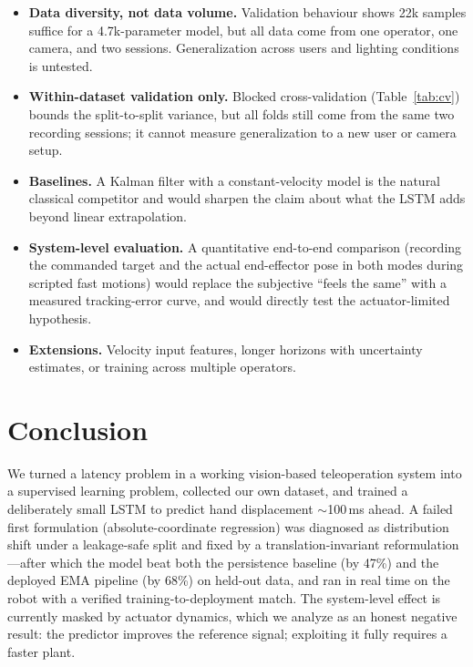 \documentclass[11pt,a4paper]{article}
\begin{document}
\begin{itemize}
  \item \textbf{Data diversity, not data volume.} Validation behaviour shows
        22k samples suffice for a 4.7k-parameter model, but all data come from
        one operator, one camera, and two sessions. Generalization across
        users and lighting conditions is untested.
  \item \textbf{Within-dataset validation only.} Blocked cross-validation
        (Table~\ref{tab:cv}) bounds the split-to-split variance, but all folds
        still come from the same two recording sessions; it cannot measure
        generalization to a new user or camera setup.
  \item \textbf{Baselines.} A Kalman filter with a constant-velocity model is
        the natural classical competitor and would sharpen the claim about
        what the LSTM adds beyond linear extrapolation.
  \item \textbf{System-level evaluation.} A quantitative end-to-end comparison
        (recording the commanded target and the actual end-effector pose in
        both modes during scripted fast motions) would replace the subjective
        ``feels the same'' with a measured tracking-error curve, and would
        directly test the actuator-limited hypothesis.
  \item \textbf{Extensions.} Velocity input features, longer horizons with
        uncertainty estimates, or training across multiple operators.
\end{itemize}

\section{Conclusion}

We turned a latency problem in a working vision-based teleoperation system
into a supervised learning problem, collected our own dataset, and trained a
deliberately small LSTM to predict hand displacement $\sim$100\,ms ahead. A
failed first formulation (absolute-coordinate regression) was diagnosed as
distribution shift under a leakage-safe split and fixed by a
translation-invariant reformulation---after which the model beat both the
persistence baseline (by 47\%) and the deployed EMA pipeline (by 68\%) on
held-out data, and ran in real time on the robot with a verified
training-to-deployment match. The system-level effect is currently masked by
actuator dynamics, which we analyze as an honest negative result: the
predictor improves the reference signal; exploiting it fully requires a faster
plant.
\end{document}
